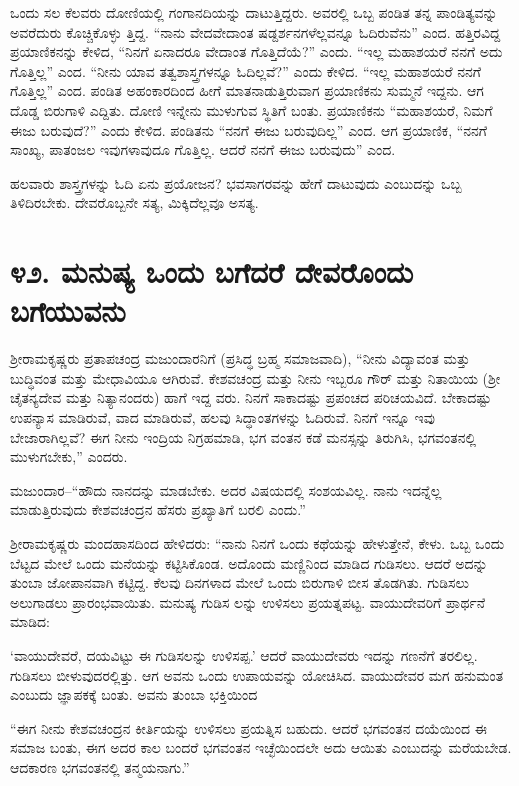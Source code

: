 ಒಂದು ಸಲ ಕೆಲವರು ದೋಣಿಯಲ್ಲಿ ಗಂಗಾನದಿಯನ್ನು ದಾಟುತ್ತಿದ್ದರು. ಅವರಲ್ಲಿ ಒಬ್ಬ ಪಂಡಿತ ತನ್ನ ಪಾಂಡಿತ್ಯವನ್ನು ಅವರೆದುರು ಕೊಚ್ಚಿಕೊಳ್ಳು ತ್ತಿದ್ದ. “ನಾನು ವೇದವೇದಾಂತ ಷಡ್ದರ್ಶನಗಳೆಲ್ಲವನ್ನೂ ಓದಿರುವೆನು” ಎಂದ. ಹತ್ತಿರವಿದ್ದ ಪ್ರಯಾಣಿಕನನ್ನು ಕೇಳಿದ, “ನಿನಗೆ ಏನಾದರೂ ವೇದಾಂತ ಗೊತ್ತಿದೆಯೆ?” ಎಂದು. “ಇಲ್ಲ ಮಹಾಶಯರೆ ನನಗೆ ಅದು ಗೊತ್ತಿಲ್ಲ” ಎಂದ. “ನೀನು ಯಾವ ತತ್ವಶಾಸ್ತ್ರಗಳನ್ನೂ ಓದಿಲ್ಲವೆ?” ಎಂದು ಕೇಳಿದ. “ಇಲ್ಲ ಮಹಾಶಯರೆ ನನಗೆ ಗೊತ್ತಿಲ್ಲ” ಎಂದ. ಪಂಡಿತ ಅಹಂಕಾರದಿಂದ ಹೀಗೆ ಮಾತನಾಡುತ್ತಿರುವಾಗ ಪ್ರಯಾಣಿಕನು ಸುಮ್ಮನೆ ಇದ್ದನು. ಆಗ ದೊಡ್ಡ ಬಿರುಗಾಳಿ ಎದ್ದಿತು. ದೋಣಿ ಇನ್ನೇನು ಮುಳುಗುವ ಸ್ಥಿತಿಗೆ ಬಂತು. ಪ್ರಯಾಣಿಕನು “ಮಹಾಶಯರೆ, ನಿಮಗೆ ಈಜು ಬರುವುದೆ?” ಎಂದು ಕೇಳಿದ. ಪಂಡಿತನು “ನನಗೆ ಈಜು ಬರುವುದಿಲ್ಲ” ಎಂದ. ಆಗ ಪ್ರಯಾಣಿಕ, “ನನಗೆ ಸಾಂಖ್ಯ, ಪಾತಂಜಲ ಇವುಗಳಾವುದೂ ಗೊತ್ತಿಲ್ಲ. ಆದರೆ ನನಗೆ ಈಜು ಬರುವುದು” ಎಂದ.

ಹಲವಾರು ಶಾಸ್ತ್ರಗಳನ್ನು ಓದಿ ಏನು ಪ್ರಯೋಜನ? ಭವಸಾಗರವನ್ನು ಹೇಗೆ ದಾಟುವುದು ಎಂಬುದನ್ನು ಒಬ್ಬ ತಿಳಿದಿರಬೇಕು. ದೇವರೊಬ್ಬನೇ ಸತ್ಯ, ಮಿಕ್ಕಿದೆಲ್ಲವೂ ಅಸತ್ಯ.


\section{\num{೪೨. } ಮನುಷ್ಯ ಒಂದು ಬಗೆದರೆ ದೇವರೊಂದು ಬಗೆಯುವನು}

ಶ್ರೀರಾಮಕೃಷ್ಣರು ಪ್ರತಾಪಚಂದ್ರ ಮಜುಂದಾರನಿಗೆ (ಪ್ರಸಿದ್ಧ ಬ್ರಹ್ಮ ಸಮಾಜವಾದಿ), “ನೀನು ವಿದ್ಯಾವಂತ ಮತ್ತು ಬುದ್ಧಿವಂತ ಮತ್ತು ಮೇಧಾವಿಯೂ ಆಗಿರುವೆ. ಕೇಶವಚಂದ್ರ ಮತ್ತು ನೀನು ಇಬ್ಬರೂ ಗೌರ್ ಮತ್ತು ನಿತಾಯಿಯ (ಶ್ರೀ ಚೈತನ್ಯದೇವ ಮತ್ತು ನಿತ್ಯಾನಂದರು) ಹಾಗೆ ಇದ್ದ ವರು. ನಿನಗೆ ಸಾಕಾದಷ್ಟು ಪ್ರಪಂಚದ ಪರಿಚಯವಿದೆ. ಬೇಕಾದಷ್ಟು ಉಪನ್ಯಾಸ ಮಾಡಿರುವೆ, ವಾದ ಮಾಡಿರುವೆ, ಹಲವು ಸಿದ್ಧಾಂತಗಳನ್ನು ಓದಿರುವೆ. ನಿನಗೆ ಇನ್ನೂ ಇವು ಬೇಜಾರಾಗಿಲ್ಲವೆ? ಈಗ ನೀನು ಇಂದ್ರಿಯ ನಿಗ್ರಹಮಾಡಿ, ಭಗ ವಂತನ ಕಡೆ ಮನಸ್ಸನ್ನು ತಿರುಗಿಸಿ, ಭಗವಂತನಲ್ಲಿ ಮುಳುಗಬೇಕು,” ಎಂದರು.

ಮಜುಂದಾರ–“ಹೌದು ನಾನದನ್ನು ಮಾಡಬೇಕು. ಅದರ ವಿಷಯದಲ್ಲಿ ಸಂಶಯವಿಲ್ಲ. ನಾನು ಇದನ್ನೆಲ್ಲ ಮಾಡುತ್ತಿರುವುದು ಕೇಶವಚಂದ್ರನ ಹೆಸರು ಪ್ರಖ್ಯಾತಿಗೆ ಬರಲಿ ಎಂದು.”

ಶ್ರೀರಾಮಕೃಷ್ಣರು ಮಂದಹಾಸದಿಂದ ಹೇಳಿದರು: “ನಾನು ನಿನಗೆ ಒಂದು ಕಥೆಯನ್ನು ಹೇಳುತ್ತೇನೆ, ಕೇಳು. ಒಬ್ಬ ಒಂದು ಬೆಟ್ಟದ ಮೇಲೆ ಒಂದು ಮನೆಯನ್ನು ಕಟ್ಟಿಸಿಕೊಂಡ. ಅದೊಂದು ಮಣ್ಣಿನಿಂದ ಮಾಡಿದ ಗುಡಿಸಲು. ಆದರೆ ಅದನ್ನು ತುಂಬಾ ಜೋಪಾನವಾಗಿ ಕಟ್ಟಿದ್ದ. ಕೆಲವು ದಿನಗಳಾದ ಮೇಲೆ ಒಂದು ಬಿರುಗಾಳಿ ಬೀಸ ತೊಡಗಿತು. ಗುಡಿಸಲು ಅಲುಗಾಡಲು ಪ್ರಾರಂಭವಾಯಿತು. ಮನುಷ್ಯ ಗುಡಿಸ ಲನ್ನು ಉಳಿಸಲು ಪ್ರಯತ್ನಪಟ್ಟ. ವಾಯುದೇವರಿಗೆ ಪ್ರಾರ್ಥನೆ ಮಾಡಿದ:

‘ವಾಯುದೇವರೆ, ದಯವಿಟ್ಟು ಈ ಗುಡಿಸಲನ್ನು ಉಳಿಸಪ್ಪ.’ ಆದರೆ ವಾಯುದೇವರು ಇದನ್ನು ಗಣನೆಗೆ ತರಲಿಲ್ಲ. ಗುಡಿಸಲು ಬೀಳುವುದರಲ್ಲಿತ್ತು. ಆಗ ಅವನು ಒಂದು ಉಪಾಯವನ್ನು ಯೋಚಿಸಿದ. ವಾಯುದೇವರ ಮಗ ಹನುಮಂತ ಎಂಬುದು ಜ್ಞಾಪಕಕ್ಕೆ ಬಂತು. ಅವನು ತುಂಬಾ ಭಕ್ತಿಯಿಂದ

“ಈಗ ನೀನು ಕೇಶವಚಂದ್ರನ ಕೀರ್ತಿಯನ್ನು ಉಳಿಸಲು ಪ್ರಯತ್ನಿಸ ಬಹುದು. ಆದರೆ ಭಗವಂತನ ದಯೆಯಿಂದ ಈ ಸಮಾಜ ಬಂತು, ಈಗ ಅದರ ಕಾಲ ಬಂದರೆ ಭಗವಂತನ ಇಚ್ಛೆಯಿಂದಲೇ ಅದು ಆಯಿತು ಎಂಬುದನ್ನು ಮರೆಯಬೇಡ. ಆದಕಾರಣ ಭಗವಂತನಲ್ಲಿ ತನ್ಮಯನಾಗು.”


